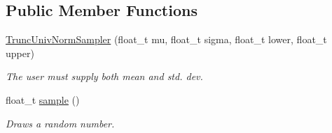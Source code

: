 \subsection*{Public Member Functions}
\begin{DoxyCompactItemize}
\item 
\hyperlink{classrvsamp_1_1TruncUnivNormSampler_af014c58aa1ed6bcd955f2b6c4a1a236c}{Trunc\+Univ\+Norm\+Sampler} (float\+\_\+t mu, float\+\_\+t sigma, float\+\_\+t lower, float\+\_\+t upper)
\begin{DoxyCompactList}\small\item\em The user must supply both mean and std. dev. \end{DoxyCompactList}\item 
float\+\_\+t \hyperlink{classrvsamp_1_1TruncUnivNormSampler_a2d6a8f2053e4ed0806718e6749288dce}{sample} ()
\begin{DoxyCompactList}\small\item\em Draws a random number. \end{DoxyCompactList}\end{DoxyCompactItemize}
